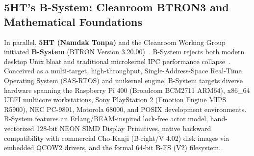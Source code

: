\documentclass[10pt,journal,compsoc,twocolumn]{article}
\begin{document}
\subsection{5HT's B-System: Cleanroom BTRON3 and Mathematical Foundations}
In parallel, \textbf{5HT (Namdak Tonpa)} and the Cleanroom Working Group initiated \textbf{B-System} (BTRON Version 3.20.00)~\cite{sokhatsky2026btron}. B-System rejects both modern desktop Unix bloat and traditional microkernel IPC performance collapse~\cite{liedtke1995l4,solomon1998inside}. Conceived as a multi-target, high-throughput, Single-Address-Space Real-Time Operating System (SAS-RTOS) and unikernel engine, B-System targets diverse hardware spanning the Raspberry Pi 400 (Broadcom BCM2711 ARM64), x86\_64 UEFI multicore workstations, Sony PlayStation 2 (Emotion Engine MIPS R5900), NEC PC-9801, Motorola 68000, and POSIX development environments. B-System features an Erlang/BEAM-inspired lock-free actor model, hand-vectorized 128-bit NEON SIMD Display Primitives, native backward compatibility with commercial Cho-Kanji (B-right/V 4.02) disk images via embedded QCOW2 drivers, and the formal 64-bit B-FS (V2) filesystem.
\end{document}
